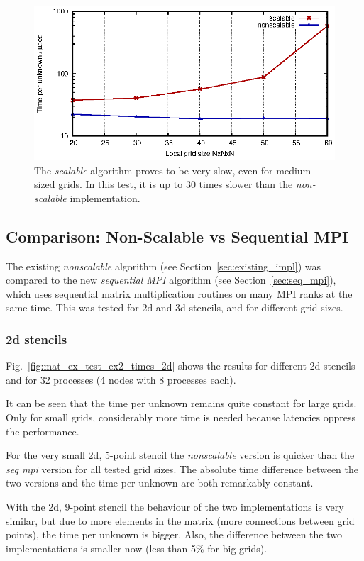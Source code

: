 \begin{figure}[tbp]
	\centering
	\includegraphics[width=1\textwidth]{scalable}
	\caption{The \textit{scalable} algorithm proves to be very slow, even for medium sized grids. In this test, it is up to 30 times slower than the \textit{non-scalable} implementation.} 
	\label{fig:scalable}
\end{figure}

\subsection{Comparison: Non-Scalable vs Sequential MPI}
The existing \textit{nonscalable} algorithm (see Section~\ref{sec:existing_impl}) was compared to the new \textit{sequential MPI} algorithm (see Section~\ref{sec:seq_mpi}), which uses sequential matrix multiplication routines on many MPI ranks at the same time. This was tested for 2d and 3d stencils, and for different grid sizes.

\subsubsection*{2d stencils}
Fig.~\ref{fig:mat_ex_test_ex2_times_2d} shows the results for different 2d stencils and for 32 processes (4 nodes with 8 processes each). 

It can be seen that the time per unknown remains quite constant for large grids. Only for small grids, considerably more time is needed because latencies oppress the performance.


For the very small 2d, 5-point stencil the \textit{nonscalable} version is quicker than the \textit{seq mpi} version for all tested grid sizes. The absolute time difference between the two versions and the time per unknown are both remarkably constant. 

With the 2d, 9-point stencil the behaviour of the two implementations is very similar, but due to more elements in the matrix (more connections between grid points), the time per unknown is bigger. Also, the difference between the two implementations is smaller now (less than 5\% for big grids). 

